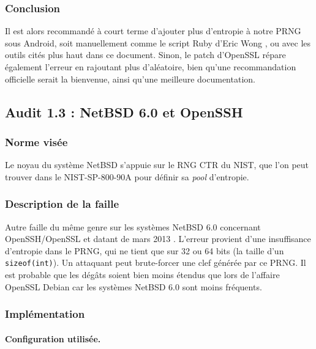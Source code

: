 		\subsubsection{Conclusion}		
		
			Il est alors recommandé à court terme d'ajouter plus d'entropie à notre PRNG sous Android, soit manuellement comme le script Ruby d'Eric Wong \cite{boblet2013android}, ou avec les outils cités plus haut dans ce document. Sinon, le patch d'OpenSSL \cite{alex2013android} répare également l'erreur en rajoutant plus d'aléatoire, bien qu'une recommandation officielle serait la bienvenue, ainsi qu'une meilleure documentation.\\

			
	\subsection{Audit 1.3 : NetBSD 6.0 et OpenSSH}
		\subsubsection{Norme visée}
		
			Le noyau du système NetBSD s'appuie sur le RNG CTR du NIST, que l'on peut trouver dans le NIST-SP-800-90A \cite{nist800-90A} pour définir sa \textit{pool} d'entropie.	
		
		\subsubsection{Description de la faille}
		
			Autre faille du même genre sur les systèmes NetBSD 6.0 concernant OpenSSH/OpenSSL et datant de mars 2013 \cite{alerteBSD2013} \cite{failleNetBSDPatrick}. L'erreur provient d'une insuffisance d'entropie dans le PRNG, qui ne tient que sur 32 ou 64 bits (la taille d'un \texttt{sizeof(int)}). Un attaquant peut brute-forcer une clef générée par ce PRNG. Il est probable que les dégâts soient bien moins étendus que lors de l'affaire OpenSSL Debian car les systèmes NetBSD 6.0 sont moins fréquents.\\
			
		\subsubsection{Implémentation}
			
			\paragraph{Configuration utilisée.\\} 
			
